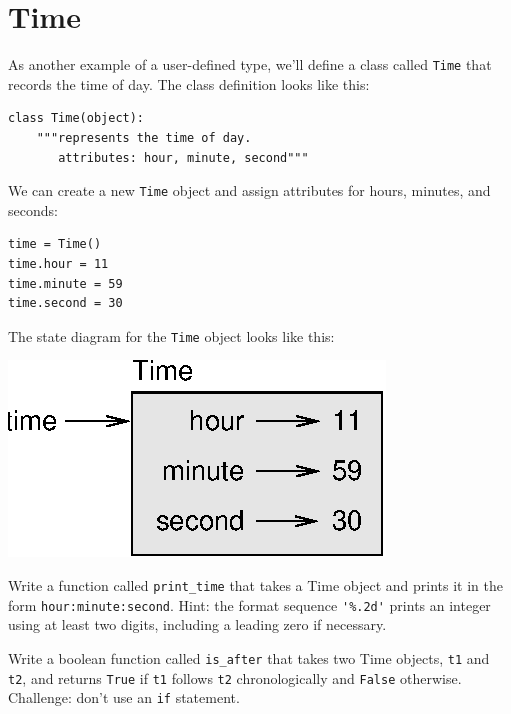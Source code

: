 \documentclass[10pt]{book}
\begin{document}
\section{Time}

As another example of a user-defined type, we'll define a class called
{\tt Time} that records the time of day.  The class definition looks
like this:


\beforeverb
\begin{verbatim}
class Time(object):
    """represents the time of day.
       attributes: hour, minute, second"""
\end{verbatim}
\afterverb
%
We can create a new {\tt Time} object and assign
attributes for hours, minutes, and seconds:

\beforeverb
\begin{verbatim}
time = Time()
time.hour = 11
time.minute = 59
time.second = 30
\end{verbatim}
\afterverb
%
The state diagram for the {\tt Time} object looks like this:


\beforefig
\centerline{\includegraphics{figs/time.eps}}
\afterfig

\begin{ex}
\label{printtime}
Write a function called \verb"print_time" that takes a 
Time object and prints it in the form {\tt hour:minute:second}.
Hint: the format sequence \verb"'%.2d'" prints an integer using
at least two digits, including a leading zero if necessary.
\end{ex}

\begin{ex}
\label{is_after}


Write a boolean function called \verb"is_after" that
takes two Time objects, {\tt t1} and {\tt t2}, and
returns {\tt True} if {\tt t1} follows {\tt t2} chronologically and
{\tt False} otherwise.  Challenge: don't use an {\tt if} statement.
\end{ex}
\end{document}

